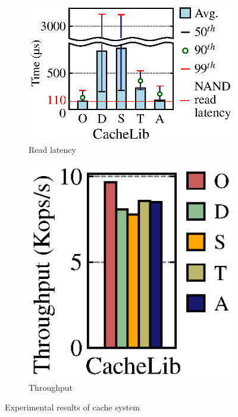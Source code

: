 \begin{figure}[t]
\begin{minipage}[c]{0.368\textwidth}
\begin{subfigure}[b]{0.52\textwidth}
            \centering
            \vspace{8pt}
            \includegraphics[width=\textwidth]{exp/cache/cache-latency.eps}
   	        \caption{Read latency}
            \label{fig:cache-latency}
        \end{subfigure}
        \hspace{5pt}
        \begin{subfigure}[b]{0.32\textwidth}
            \centering
            \includegraphics[width=\textwidth]{exp/cache/new_cache_th.eps}
            \vspace{-9pt}
            \caption{Throughput} 
            \label{fig:cache-throughput}
        \end{subfigure}
        \vspace{-10pt}
	    \caption{Experimental results of cache system}
	    \vspace{-15pt}
        \label{fig:expcache}
    \end{minipage}

\end{figure}

